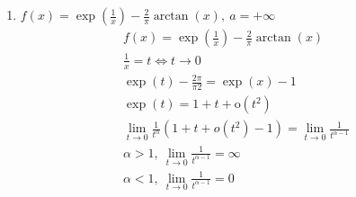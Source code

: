 		\subsection{}
		\begin{enumerate}
		\item $f(x)=\exp (\frac{1}{x})-\frac{2}{\pi}\arctan(x),\ a=+\infty$
			\begin{gather*}
				f(x) = \exp(\frac{1}{x}) - \frac{2}{\pi}\arctan(x)\\
				\frac{1}{x} = t \Leftrightarrow t \to 0\\
				\exp(t) - \frac{2\pi}{\pi 2} = \exp(x) - 1\\
				\exp(t) = 1 + t + \text{o}(t^2)\\
				\lim\limits_{t \to 0}\frac{1}{t^{\alpha}}(1 + t + o(t^2) - 1) = \lim\limits_{t \to 0}\frac{1}{t^{\alpha - 1}}\\
				\alpha >1,\ \lim\limits_{t \to 0}\frac{1}{t^{\alpha - 1}} = \infty\\
				\alpha <1,\ \lim\limits_{t \to 0}\frac{1}{t^{\alpha - 1}} = 0
			\end{gather*}
			

\end{enumerate}
